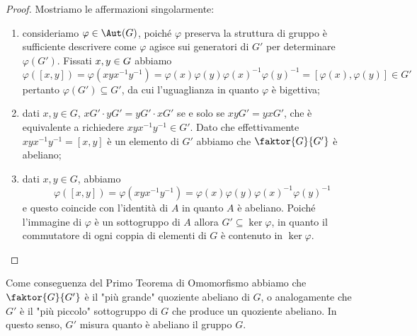 \documentclass[11pt]{scrartcl}
\begin{document}
\begin{proof}
    Mostriamo le affermazioni singolarmente:
    \begin{enumerate}[(1)]
        \item consideriamo $\varphi \in \Aut(G)$, poiché $\varphi$ preserva la struttura
        di gruppo è sufficiente descrivere come $\varphi$ agisce sui 
        generatori di $G'$ per determinare $\varphi(G')$. 
        Fissati $x, y \in\nolinebreak G$ abbiamo 
        \[
            \varphi([x, y]) = \varphi(xyx^{-1}y^{-1}) = \varphi(x)\varphi(y)
            \varphi(x)^{-1}\varphi(y)^{-1} = [\varphi(x), \varphi(y)]\in G'
        \]pertanto $\varphi(G') \subseteq G'$, da cui l'uguaglianza in quanto 
        $\varphi$ è bigettiva;
        \item dati $x, y \in G$, $xG'\cdot yG' = yG'\cdot xG'$ se e solo se 
        $xyG' = yxG'$, che è equivalente a richiedere $xyx^{-1}y^{-1} \in G'$. 
        Dato che effettivamente $xyx^{-1}y^{-1} = [x, y]$ è un elemento di $G'$
        abbiamo che $\faktor{G}{G'}$ è abeliano;
        \item dati $x, y \in G$, abbiamo 
        \[
            \varphi([x, y]) = \varphi(xyx^{-1}y^{-1}) = 
        \varphi(x)\varphi(y)\varphi(x)^{-1}\varphi(y)^{-1}
        \]
        e questo coincide con
        l'identità di $A$ in quanto $A$ è abeliano. Poiché l'immagine di $\varphi$
        è un sottogruppo di $A$ allora $G' \subseteq \ker\varphi$, in quanto
        il commutatore di ogni coppia di elementi di $G$ è contenuto in $\ker \varphi$.
    \end{enumerate}
\end{proof}

\begin{remark}
    Come conseguenza del Primo Teorema di Omomorfismo abbiamo che $\faktor{G}{G'}$ è 
    il "più grande" quoziente abeliano di $G$, o analogamente che 
    $G'$ è il "più piccolo" sottogruppo di $G$ che produce un quoziente abeliano.
    In questo senso, $G'$ misura quanto è abeliano il gruppo $G$.
\end{remark}
\end{document}
